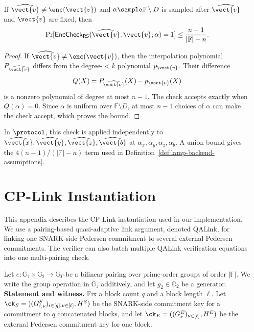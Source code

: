\begin{lemma}
\label{lem:rs-barycentric-soundness}
If \(\widehat{\vect{v}}\neq\enc(\vect{v})\) and
\(\alpha\sample\mathbb{F}\setminus D\) is sampled after
\(\widehat{\vect{v}}\) and \(\vect{v}\) are fixed, then
\[
  \Pr[
    \mathsf{EncCheck}_{\mathsf{RS}}
    (\widehat{\vect{v}},\vect{v};\alpha)=1
  ]
  \le
  \frac{n-1}{|\mathbb{F}|-n}.
\]
\end{lemma}

\begin{proof}
If \(\widehat{\vect{v}}\neq\enc(\vect{v})\), then the interpolation polynomial
\(P_{\widehat{\vect{v}}}\) differs from the degree-\(<k\) polynomial
\(p_{\vect{v}}\).  Their difference
\[
  Q(X)=P_{\widehat{\vect{v}}}(X)-p_{\vect{v}}(X)
\]
is a nonzero polynomial of degree at most \(n-1\).  The check accepts exactly
when \(Q(\alpha)=0\).  Since \(\alpha\) is uniform over
\(\mathbb{F}\setminus D\), at most \(n-1\) choices of \(\alpha\) can make the
check accept, which proves the bound.
\end{proof}

In \(\protocol\), this check is applied independently to
\(\widehat{\vect{x}},\widehat{\vect{y}},\widehat{\vect{z}},
\widehat{\vect{b}}\) at
\(\alpha_x,\alpha_y,\alpha_z,\alpha_b\).  A union bound gives the
\(4(n-1)/(|\mathbb{F}|-n)\) term used in
Definition~\ref{def:lamp-backend-assumptions}.

\iffalse
\section{CP-Link Instantiation}
\label{app:cplink-instant}

This appendix describes the CP-Link instantiation used in our implementation.
We use a pairing-based quasi-adaptive link argument, denoted QALink, for
linking one SNARK-side Pedersen commitment to several external Pedersen
commitments.  The verifier can also batch multiple QALink verification
equations into one multi-pairing check.

Let \(e:\mathbb{G}_1\times\mathbb{G}_2\to\mathbb{G}_T\) be a bilinear pairing
over prime-order groups of order \(|\mathbb{F}|\).  We write the group
operation in \(\mathbb{G}_1\) additively, and let \(g_2\in\mathbb{G}_2\) be a
generator. \\

\noindent\textbf{Statement and witness.}
Fix a block count \(q\) and a block length \(\ell\).  Let
\(\ck_S=((G^S_{i,\nu})_{i\in[q],\nu\in[\ell]},H^S)\) be the SNARK-side
commitment key for a commitment to \(q\) concatenated blocks, and let
\(\ck_E=((G^E_{\nu})_{\nu\in[\ell]},H^E)\) be the external Pedersen commitment
key for one block.

